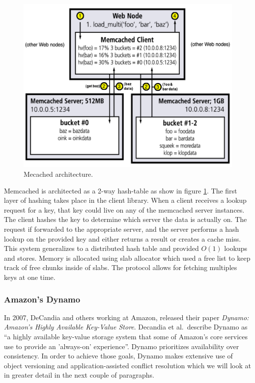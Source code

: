 \documentclass[]{article}
\begin{document}
\begin{figure}
    \centering
    \includegraphics[width=1.0\linewidth]{img/memcached}
    \caption[Mecached architecture.]{Mecached architecture. \cite{fitzpatrick_distributed_2004}}
    \label{fig:memcached}
\end{figure}

Memcached is architected as a 2-way hash-table as show in figure \ref{fig:memcached}. The first layer of hashing takes place in the client library. When a client receives a lookup request for a key, that key could live on any of the memcached server instances. The client hashes the key to determine which server the data is actually on. The request if forwarded to the appropriate server, and the server performs a hash lookup on the provided key and either returns a result or creates a cache miss. This system generalizes to a distributed hash table and provided $O(1)$ lookups and stores. Memory is allocated using slab allocator which used a free list to keep track of free chunks inside of slabs. The protocol allows for fetching multiples keys at one time. 

\subsubsection{Amazon's Dynamo}\label{sssec:amazons-dynamo}
In 2007, DeCandia and others working at Amazon, released their paper \textit{Dynamo: Amazon's Highly Available Key-Value Store}\cite{decandia_dynamo:_2007}. Decandia et al.\ describe Dynamo as ``a highly available key-value storage system that some of Amazon's core services use to provide an 'always-on' experience''. Dynamo prioritizes availability over consistency. In order to achieve those goals, Dynamo makes extensive use of object versioning and application-assisted conflict resolution which we will look at in greater detail in the next couple of paragraphs.
\end{document}
